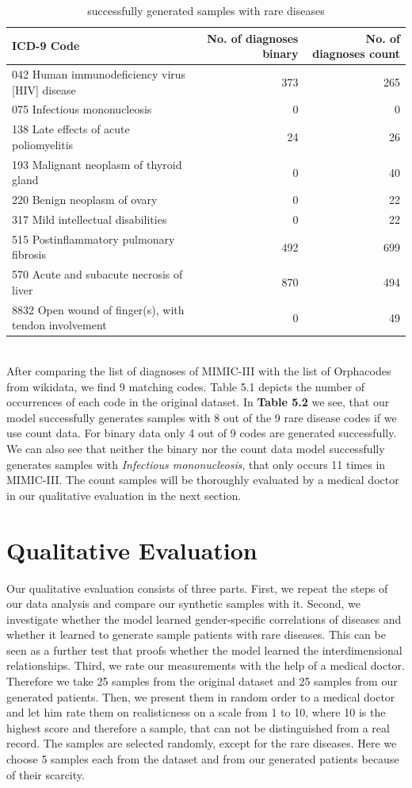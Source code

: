 \documentclass[11pt, a4paper, oneside]{book}
\begin{document}
\begin{table}
\begin{tabularx}{\textwidth}{X|r|r}
ICD-9 Code & No. of diagnoses binary & No. of diagnoses count\\
\hline
042 Human immunodeficiency virus [HIV] disease	& 373 & 265\\
075 Infectious mononucleosis & 0 & 0\\
138 Late effects of acute poliomyelitis & 24  & 26\\
193 Malignant neoplasm of thyroid gland & 0 & 40\\
220 Benign neoplasm of ovary & 0 & 22\\
317 Mild intellectual disabilities & 0 & 22\\
515 Postinflammatory pulmonary fibrosis & 492 & 699\\
570 Acute and subacute necrosis of liver & 870 & 494\\
8832 Open wound of finger(s), with tendon involvement & 0 & 49\\ 
\end{tabularx}
\caption{\label{tab:rare-generated}successfully generated samples with rare diseases}
\end{table}
\\
After comparing the list of diagnoses of MIMIC-III with the list of Orphacodes from wikidata, we find 9 matching codes. Table 5.1 depicts the number of occurrences of each code in the original dataset. In \textbf{Table 5.2} we see, that our model successfully generates samples with 8 out of the 9 rare disease codes if we use count data. For binary data only 4 out of 9 codes are generated successfully. We can also see that neither the binary nor the count data model successfully generates samples with \textit{Infectious mononucleosis}, that only occurs 11 times in MIMIC-III. 
The count samples will be thoroughly evaluated by a medical doctor in our qualitative evaluation in the next section.


\section{Qualitative Evaluation}
Our qualitative evaluation consists of three parts. First, we repeat the steps of our data analysis and compare our synthetic samples with it. Second, we investigate whether the model learned gender-specific correlations of diseases and whether it learned to generate sample patients with rare diseases. This can be seen as a further test that proofs whether the model learned the interdimensional relationships. Third, we rate our measurements with the help of a medical doctor. Therefore we take 25 samples from the original dataset and 25 samples from our generated patients. Then, we present them in random order to a medical doctor and let him rate them on realisticness on a scale from 1 to 10, where 10 is the highest score and therefore a sample, that can not be distinguished from a real record.
The samples are selected randomly, except for the rare diseases. Here we choose 5 samples each from the dataset and from our generated patients because of their scarcity.
\end{document}
